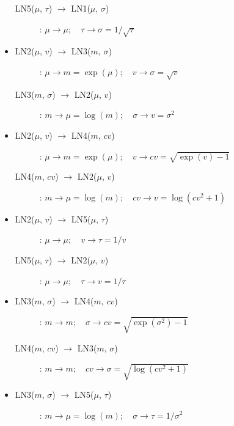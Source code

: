 \begin{itemize}
\begin{description}
\item[LN5($\mu$, $\tau$) $\rightarrow$ LN1($\mu$, $\sigma$)]:
$\mu \rightarrow \mu; \quad \tau \rightarrow \sigma=1/\sqrt{\tau}$
\end{description}

\item 
\begin{description}
\item[LN2($\mu$, $v$) $\rightarrow$ LN3($m$, $\sigma$)]:
$\mu \rightarrow m=\exp(\mu); \quad v \rightarrow \sigma=\sqrt{v}$

\item[LN3($m$, $\sigma$) $\rightarrow$ LN2($\mu$, $v$)]:
$m \rightarrow \mu=\log(m); \quad \sigma \rightarrow v=\sigma^2$
\end{description}


\item 
\begin{description}
\item[LN2($\mu$, $v$) $\rightarrow$ LN4($m$, $cv$)]:
$\mu \rightarrow m=\exp(\mu); \quad v \rightarrow cv=\sqrt{\exp(v) -1}$

\item[LN4($m$, $cv$) $\rightarrow$ LN2($\mu$, $v$)]:
$m \rightarrow \mu=\log(m); \quad cv \rightarrow v=\log(cv^2+1)$
\end{description}

\item 
\begin{description}
\item[LN2($\mu$, $v$) $\rightarrow$ LN5($\mu$, $\tau$)]:
$\mu \rightarrow \mu; \quad v \rightarrow \tau=1/v$

\item[LN5($\mu$, $\tau$) $\rightarrow$ LN2($\mu$, $v$)]:
$\mu \rightarrow \mu; \quad \tau \rightarrow v=1/\tau$
\end{description}

\item 
\begin{description}
\item[LN3($m$, $\sigma$) $\rightarrow$ LN4($m$, $cv$)]:
$m \rightarrow m; \quad \sigma \rightarrow cv=\sqrt{\exp(\sigma^2)-1}$

\item[LN4($m$, $cv$) $\rightarrow$ LN3($m$, $\sigma$)]:
$m \rightarrow m; \quad cv \rightarrow \sigma=\sqrt{\log(cv^2 + 1)}$
\end{description}

\item 
\begin{description}
\item[LN3($m$, $\sigma$) $\rightarrow$ LN5($\mu$, $\tau$)]:
$m \rightarrow \mu=\log(m); \quad \sigma \rightarrow \tau=1/\sigma^2$


\end{description}
\end{itemize}
